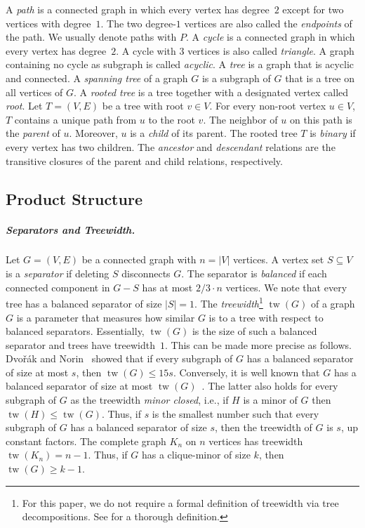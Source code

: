 \documentclass[a4paper,english,cleveref,thm-restate]{lipics-v2021}
\DeclareMathOperator{\tw}{tw}
\begin{document}
A \emph{path} is a connected graph in which every vertex has degree~$2$ except for two vertices with degree~$1$.
The two degree-$1$ vertices are also called the \emph{endpoints} of the path.
We usually denote paths with $P$.
A \emph{cycle} is a connected graph in which every vertex has degree~$2$.
A cycle with $3$ vertices is also called \emph{triangle}.
A graph containing no cycle as subgraph is called \emph{acyclic}.
A \emph{tree} is a graph that is acyclic and connected.
A \emph{spanning tree} of a graph $G$ is a subgraph of $G$ that is a tree on all vertices of $G$.
A \emph{rooted tree} is a tree together with a designated vertex called \emph{root}.
Let $T = (V, E)$ be a tree with root $v \in V$.
For every non-root vertex $u \in V$, $T$ contains a unique path from $u$ to the root $v$.
The neighbor of $u$ on this path is the \emph{parent} of $u$.
Moreover, $u$ is a \emph{child} of its parent.
The rooted tree $T$ is \emph{binary} if every vertex has two children.
The \emph{ancestor} and \emph{descendant} relations are the transitive closures of the parent and child relations, respectively.



\subsection{Product Structure}

\subparagraph{Separators and Treewidth.}

Let $G = (V, E)$ be a connected graph with $n = |V|$ vertices.
A vertex set $S \subseteq V$ is a \emph{separator} if deleting $S$ disconnects $G$.
The separator is \emph{balanced} if each connected component in $G - S$ has at most $2/3 \cdot n$ vertices.
We note that every tree has a balanced separator of size $|S| = 1$.
The \emph{treewidth}\footnote{For this paper, we do not require a formal definition of treewidth via tree decompositions. See \cite[Section~7]{cygan_treewidth_2015} for a thorough definition.} $\tw(G)$ of a graph $G$ is a parameter that measures how similar $G$ is to a tree with respect to balanced separators.
Essentially, $\tw(G)$ is the size of such a balanced separator and trees have treewidth~$1$.
This can be made more precise as follows.
Dvořák and Norin~\cite{Treew_Graph_Balan_Separ-DvoraNorin19} showed that if every subgraph of $G$ has a balanced separator of size at most $s$, then $\tw(G) \le 15s$.
Conversely, it is well known that $G$ has a balanced separator of size at most $\tw(G)$~\cite[Lemma~7.20]{cygan_treewidth_2015}.
The latter also holds for every subgraph of $G$ as the treewidth \emph{minor closed}, i.e., if $H$ is a minor of $G$ then $\tw(H) \le \tw(G)$.
Thus, if $s$ is the smallest number such that every subgraph of $G$ has a balanced separator of size $s$, then the treewidth of $G$ is $s$, up constant factors.
%
The complete graph $K_n$ on $n$ vertices has treewidth $\tw(K_n) = n - 1$.
Thus, if $G$ has a clique-minor of size $k$, then $\tw(G) \ge k - 1$.
\end{document}
